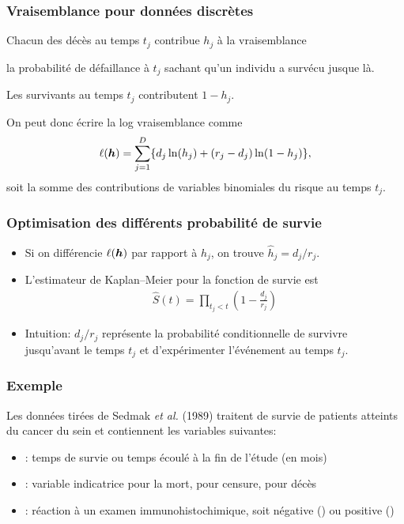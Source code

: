 \documentclass{beamer}
\begin{document}
\begin{frame}
\frametitle{Vraisemblance pour données discrètes}
\bi \item Chacun des décès au temps $t_j$ contribue $h_j$ à la vraisemblance 
\bi \item la probabilité de défaillance à $t_j$ sachant qu'un individu a survécu jusque là. \ei 
\item 
Les survivants au temps $t_j$ contributent $1-h_j$.
\item 
On peut donc écrire la log vraisemblance comme
\begin{align*}
 \ell(\boldsymbol {h}) = \sum_{j=1}^D \{ d_j \ln(h_j) + (r_j-d_j)\ln(1-h_j)\},
\end{align*}
soit la somme des contributions de variables binomiales du risque au temps $t_j$.
\ei
\end{frame}
\begin{frame}
\frametitle{Optimisation des différents probabilité de survie}
\begin{itemize}
\item Si on différencie $\ell(\boldsymbol {h})$ par rapport à $h_j$, on trouve $\widehat{h}_j = d_j/r_j$.
\item L'estimateur de Kaplan--Meier pour la fonction de survie est
\begin{align*}
\widehat{S}(t) = \prod_{t_j < t} \left( 1 - \frac{d_j}{r_j} \right)                                                                      \end{align*}
\item 
Intuition: $d_j/r_j$ représente la probabilité conditionnelle de survivre jusqu'avant le temps $t_j$ et d'expérimenter l'événement au temps $t_j$. 
\end{itemize}
\end{frame}

\begin{frame}
\frametitle{Exemple}
 Les données  tirées de Sedmak \textsl{et al.} (1989) traitent de survie de patients atteints du cancer du sein et contiennent les variables suivantes:
\begin{itemize}
 
\item {}: temps de survie ou temps écoulé à la fin de l'étude (en mois)
\item {}: variable indicatrice pour la mort,  pour censure,  pour décès
\item {}: réaction à un examen immunohistochimique, soit négative () ou positive ()
\end{itemize}
%    
% 
\end{frame}
\end{document}
